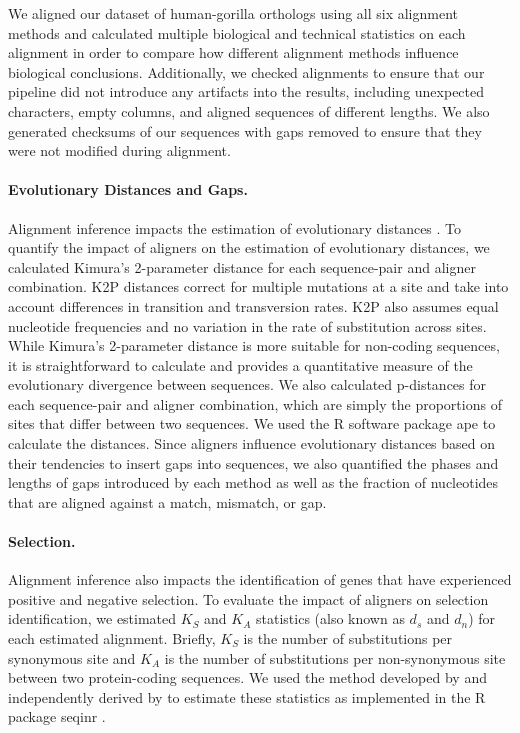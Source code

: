 \documentclass[12pt,letterpaper]{article}
\begin{document}
We aligned our dataset of human-gorilla orthologs using all six alignment methods and calculated multiple biological and technical statistics on each alignment in order to compare how different alignment methods influence biological conclusions.
%
Additionally, we checked alignments to ensure that our pipeline did not introduce any artifacts into the results, including unexpected characters, empty columns, and aligned sequences of different lengths. We also generated checksums of our sequences with gaps removed to ensure that they were not modified during alignment.

\paragraph{Evolutionary Distances and Gaps.}

Alignment inference impacts the estimation of evolutionary distances \citep{redelings2007incorporating}. To quantify the impact of aligners on the estimation of evolutionary distances, we calculated Kimura's 2-parameter distance \citep[K2P;][]{kimura1980simple} for each sequence-pair and aligner combination.  K2P distances correct for multiple mutations at a site and take into account differences in transition and transversion rates. K2P also assumes equal nucleotide frequencies and no variation in the rate of substitution across sites. While Kimura's 2-parameter distance is more suitable for non-coding sequences, it is straightforward to calculate and provides a quantitative measure of the evolutionary divergence between sequences. We also calculated p-distances \citep{saitou1987neighbor} for each sequence-pair and aligner combination, which are simply the proportions of sites that differ between two sequences. We used the R \citep{r2024} software package ape \citep{paradis2019ape} to calculate the distances.
%
Since aligners influence evolutionary distances based on their tendencies to insert gaps into sequences, we also quantified the phases and lengths of gaps introduced by each method as well as the fraction of nucleotides that are aligned against a match, mismatch, or gap.

\paragraph{Selection.}
Alignment inference also impacts the identification of genes that have experienced positive and negative selection. To evaluate the impact of aligners on selection identification, we estimated $K_S$ and $K_A$ statistics (also known as $d_s$ and $d_n$) for each estimated alignment. Briefly, $K_S$ is the number of substitutions per synonymous site and $K_A$ is the number of substitutions per non-synonymous site between two protein-coding sequences. We used the method developed by \cite{ka_ks_li_1993} and independently derived by \cite{Pamilo1993} to estimate these statistics as implemented in the R package seqinr \citep{seqinr}. 
\end{document}
